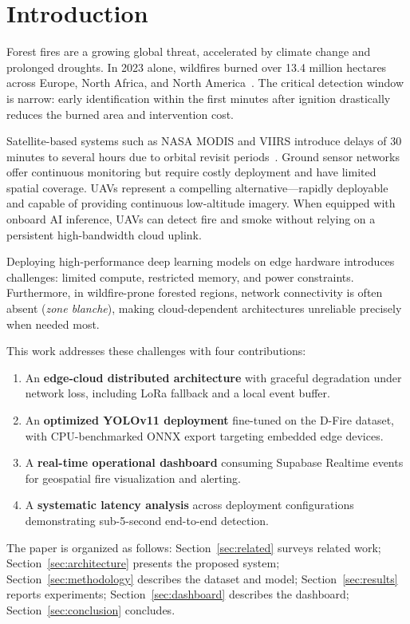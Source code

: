 \documentclass[conference]{IEEEtran}
\begin{document}
\section{Introduction}

Forest fires are a growing global threat, accelerated by climate change
and prolonged droughts. In 2023 alone, wildfires burned over
13.4 million hectares across Europe, North Africa, and North
America~\cite{liu2025advancements}. The critical detection window is
narrow: early identification within the first minutes after ignition
drastically reduces the burned area and intervention cost.

Satellite-based systems such as NASA MODIS and VIIRS introduce delays
of 30 minutes to several hours due to orbital revisit
periods~\cite{morchid2025fire}. Ground sensor networks offer
continuous monitoring but require costly deployment and have limited
spatial coverage. UAVs represent a compelling alternative—rapidly
deployable and capable of providing continuous low-altitude imagery.
When equipped with onboard AI inference, UAVs can detect fire and smoke
without relying on a persistent high-bandwidth cloud uplink.

Deploying high-performance deep learning models on edge hardware
introduces challenges: limited compute, restricted memory, and power
constraints. Furthermore, in wildfire-prone forested regions, network
connectivity is often absent (\textit{zone blanche}), making
cloud-dependent architectures unreliable precisely when needed most.

This work addresses these challenges with four contributions:
\begin{enumerate}
  \item An \textbf{edge-cloud distributed architecture} with graceful
        degradation under network loss, including LoRa fallback and a
        local event buffer.
  \item An \textbf{optimized YOLOv11 deployment} fine-tuned on the
        D-Fire dataset, with CPU-benchmarked ONNX export targeting
        embedded edge devices.
  \item A \textbf{real-time operational dashboard} consuming Supabase
        Realtime events for geospatial fire visualization and alerting.
  \item A \textbf{systematic latency analysis} across deployment
        configurations demonstrating sub-5-second end-to-end detection.
\end{enumerate}

The paper is organized as follows: Section~\ref{sec:related} surveys
related work; Section~\ref{sec:architecture} presents the proposed
system; Section~\ref{sec:methodology} describes the dataset and model;
Section~\ref{sec:results} reports experiments; Section~\ref{sec:dashboard}
describes the dashboard; Section~\ref{sec:conclusion} concludes.
\end{document}
